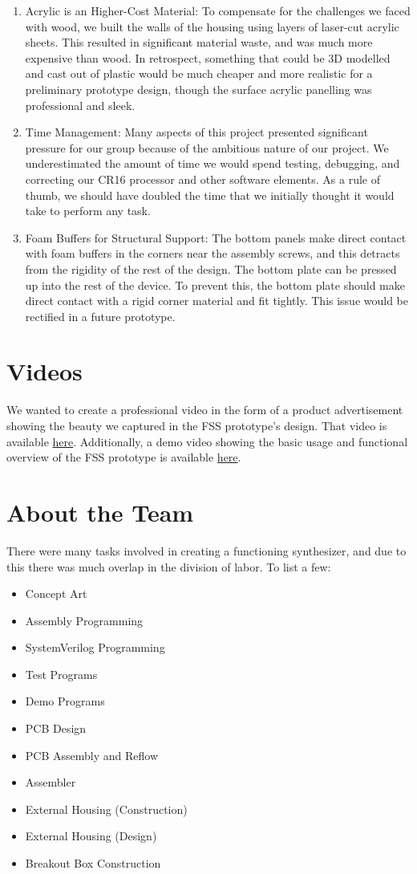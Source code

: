 \documentclass[conference]{IEEEtran}
\begin{document}
\begin{enumerate}
  \item Acrylic is an Higher-Cost Material: To compensate for the challenges we faced with wood, we built the walls of the housing using layers of laser-cut acrylic sheets. This resulted in significant material waste, and was much more expensive than wood. In retrospect, something that could be 3D modelled and cast out of plastic would be much cheaper and more realistic for a preliminary prototype design, though the surface acrylic panelling was professional and sleek.
  \item Time Management: Many aspects of this project presented significant pressure for our group because of the ambitious nature of our project. We underestimated the amount of time we would spend testing, debugging, and correcting our CR16 processor and other software elements. As a rule of thumb, we should have doubled the time that we initially thought it would take to perform any task.
  \item Foam Buffers for Structural Support: The bottom panels make direct contact with foam buffers in the corners near the assembly screws, and this detracts from the rigidity of the rest of the design. The bottom plate can be pressed up into the rest of the device. To prevent this, the bottom plate should make direct contact with a rigid corner material and fit tightly. This issue would be rectified in a future prototype.
\end{enumerate}
\section{Videos}
We wanted to create a professional video in the form of a product advertisement showing the beauty we captured in the FSS prototype's design. That video is available \href{https://jacobpeterson.net/uofu-ece-3710/ad-video-redirect.html}{here}. Additionally, a demo video showing the basic usage and functional overview of the FSS prototype is available \href{https://jacobpeterson.net/uofu-ece-3710/demo-video-redirect.html}{here}.

\section{About the Team}
There were many tasks involved in creating a functioning synthesizer, and due to this there was much overlap in the division of labor. To list a few:

\begin{itemize}
\item Concept Art
\item Assembly Programming
\item SystemVerilog Programming
\item Test Programs
\item Demo Programs
\item PCB Design
\item PCB Assembly and Reflow
\item Assembler
\item External Housing (Construction)
\item External Housing (Design)
\item Breakout Box Construction
\end{itemize}
\end{document}
